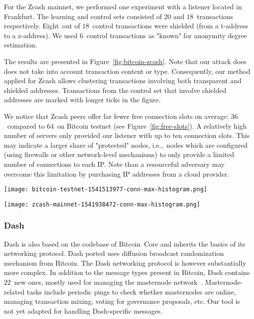 For the Zcash mainnet, we performed one experiment with a listener located in Frankfurt.
The learning and control sets consisted of $20$ and $18$~transactions respectively.
Eight~out of $18$~control transactions were shielded (from a t-address to a z-address).
We used $6$~control transactions as "known" for anonymity degree estimation.

The results are presented in Figure~\ref{fig:bitcoin-zcash}.
Note that our attack does does not take into account transaction content or type.
Consequently, our method applied for Zcash allows clustering transactions involving both transparent and shielded addresses.
Transactions from the control set that involve shielded addresses are marked with longer ticks in the figure.

We notice that Zcash peers offer far fewer free connection slots on average: $36$~compared to $64$~on Bitcoin testnet (see Figure~\ref{fig:free-slots}).
A relatively high number of servers only provided our listener with up to ten connection slots.
This may indicate a larger share of "protected" nodes, i.e.,~nodes which are configured (using firewalls or other network-level mechanisms) to only provide a limited number of connections to each IP.
Note than a resourceful adversary may overcome this limitation by purchasing IP addresses from a cloud provider.

\begin{figure*}
	\centering
	\begin{minipage}{0.5\textwidth}
		\centering
		\texttt{[image: bitcoin-testnet-1541513977-conn-max-histogram.png]}
		\caption{Free slots: Bitcoin testnet}
	\end{minipage}\hfill
	\begin{minipage}{0.5\textwidth}
		\centering
		\texttt{[image: zcash-mainnet-1541938472-conn-max-histogram.png]}
		\caption{Free slots: Zcash mainnet}
	\end{minipage}\hfill
	\label{fig:free-slots}
\end{figure*}


\subsubsection{Dash}

Dash is also based on the codebase of Bitcoin~Core and inherits the basics of its networking protocol.
Dash ported uses diffusion broadcast randomization mechanism from Bitcoin.
The Dash networking protocol is however substantially more complex.
In addition to the message types present in Bitcoin, Dash contains $22$~new ones, mostly used for managing the masternode network~\cite{Schinzel2015}.
Masternode-related tasks include periodic pings to check whether masternodes are online, managing transaction mixing, voting for governance proposals, etc.
Our tool is not yet adapted for handling Dash-specific messages.

